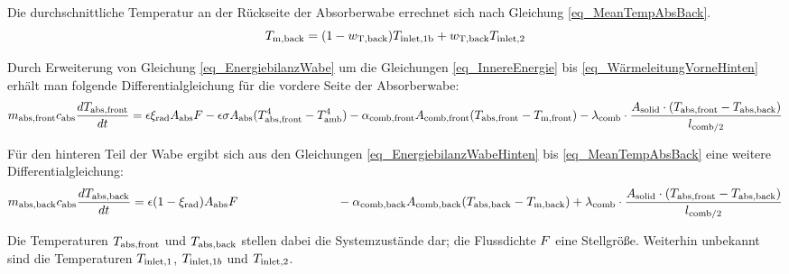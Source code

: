 Die durchschnittliche Temperatur an der Rückseite der Absorberwabe errechnet sich nach Gleichung \ref{eq_MeanTempAbsBack}.
\begin{equation} \label{eq_MeanTempAbsBack}
    T_{\mathrm{m,back}}  = (1-w_{\mathrm{T,back}}) T_{\mathrm{inlet,}\mathrm{1b}} + w_{\mathrm{T,back}} T_{\mathrm{inlet,}2}
\end{equation}

Durch Erweiterung von Gleichung \ref{eq_EnergiebilanzWabe} um die Gleichungen \ref{eq_InnereEnergie} bis \ref{eq_WärmeleitungVorneHinten} erhält man folgende Differentialgleichung für die vordere Seite der Absorberwabe:
\setlength{\eqlinespacing}{25pt}
\begin{dmath} \label{eq_GesamtgleichungEnergiebilanzWabeVorne}
    m_{\mathrm{abs,front}}  c_{\mathrm{abs}} \frac{d \TAbsorberFront}{d t} = \epsilon \xi_{\mathrm{rad}} \SurfaceFront \FluxSolar -  \epsilon \sigma \SurfaceFront (\TAbsorberFront^4-\TAmbient^4) - \HeatTransferCoefficientAbsorberFront \HeatTransferSurfaceFront (\TAbsorberFront-T_{\mathrm{m,front}}) - \lambda_{\mathrm{comb}} \cdot \frac{\SurfaceFrontSolid \cdot (\TAbsorberFront-\TAbsorberBack)}{l_{\mathrm{comb}/2}}
\end{dmath}

Für den hinteren Teil der Wabe ergibt sich aus den Gleichungen \ref{eq_EnergiebilanzWabeHinten} bis \ref{eq_MeanTempAbsBack} eine weitere Differentialgleichung:
\setlength{\eqlinespacing}{25pt}
\begin{dmath} \label{eq_GesamtgleichungEnergiebilanzWabeHinten}
    m_{\mathrm{abs,back}}  c_{\mathrm{abs}} \frac{d \TAbsorberBack}{d t} = \epsilon (1-\xi_{\mathrm{rad}}) \SurfaceFront \FluxSolar \qquad \qquad \qquad \qquad -  \HeatTransferCoefficientAbsorberBack \HeatTransferSurfaceBack (\TAbsorberBack-T_{\mathrm{m,back}}) + \lambda_{\mathrm{comb}} \cdot \frac{\SurfaceFrontSolid \cdot (\TAbsorberFront-\TAbsorberBack)}{l_{\mathrm{comb}/2}}
\end{dmath}


Die Temperaturen $T_{\mathrm{abs,front}}$ und $T_{\mathrm{abs,back}}$ stellen dabei die Systemzustände dar; die Flussdichte $F$ eine Stellgröße.
Weiterhin unbekannt sind die Temperaturen $T_{\mathrm{inlet,}1}$, $T_{\mathrm{inlet,}1b}$ und $T_{\mathrm{inlet,}2}$.

